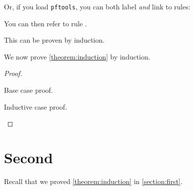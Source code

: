 \documentclass{scrartcl}
\begin{document}
  Or, if you load \texttt{pftools}, you can both label \emph{and} link to rules:
  You can then refer to rule .
  
  \begin{theorem}
      \label{theorem:induction}
    This can be proven by induction.
  \end{theorem}
  
  We now prove \cref{theorem:induction} by induction.
  
  \begin{proof} \hfill
    \begin{indproof}
       Base case proof.

       Inductive case proof.
    \end{indproof}
  \end{proof}

  
\section{Second}

Recall that we proved \cref{theorem:induction} in \cref{section:first}.

\lipsum[4]

\printbibliography
\end{document}
